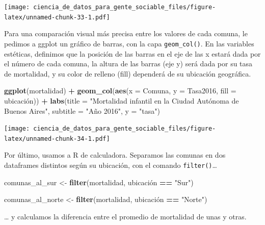 \documentclass[spanish,]{book}
\newenvironment{Shaded}{\begin{snugshade}}{\end{snugshade}}
\newcommand{\DataTypeTok}[1]{\textcolor[rgb]{0.13,0.29,0.53}{#1}}
\newcommand{\KeywordTok}[1]{\textcolor[rgb]{0.13,0.29,0.53}{\textbf{#1}}}
\newcommand{\NormalTok}[1]{#1}
\newcommand{\OperatorTok}[1]{\textcolor[rgb]{0.81,0.36,0.00}{\textbf{#1}}}
\newcommand{\StringTok}[1]{\textcolor[rgb]{0.31,0.60,0.02}{#1}}
\begin{document}
\texttt{[image: ciencia\_de\_datos\_para\_gente\_sociable\_files/figure-latex/unnamed-chunk-33-1.pdf]}

Para una comparación visual más precisa entre los valores de cada comuna, le pedimos a ggplot un gráfico de barras, con la capa \texttt{geom\_col()}. En las variables estéticas, definimos que la posición de las barras en el eje de las x estará dada por el número de cada comuna, la altura de las barras (eje y) será dada por su tasa de mortalidad, y su color de relleno (fill) dependerá de su ubicación geográfica.

\begin{Shaded}
\begin{Highlighting}[]
\KeywordTok{ggplot}\NormalTok{(mortalidad) }\OperatorTok{+}
\StringTok{    }\KeywordTok{geom_col}\NormalTok{(}\KeywordTok{aes}\NormalTok{(}\DataTypeTok{x =}\NormalTok{ Comuna, }\DataTypeTok{y =}\NormalTok{ Tasa2016, }\DataTypeTok{fill =}\NormalTok{ ubicación)) }\OperatorTok{+}
\StringTok{    }\KeywordTok{labs}\NormalTok{(}\DataTypeTok{title =} \StringTok{"Mortalidad infantil en la Ciudad Autónoma de Buenos Aires"}\NormalTok{,}
         \DataTypeTok{subtitle =} \StringTok{"Año 2016"}\NormalTok{,}
         \DataTypeTok{y =} \StringTok{"tasa"}\NormalTok{) }
\end{Highlighting}
\end{Shaded}

\texttt{[image: ciencia\_de\_datos\_para\_gente\_sociable\_files/figure-latex/unnamed-chunk-34-1.pdf]}

Por último, usamos a R de calculadora. Separamos las comunas en dos dataframes distintos según su ubicación, con el comando \texttt{filter()}\ldots{}

\begin{Shaded}
\begin{Highlighting}[]
\NormalTok{comunas_al_sur <-}\StringTok{ }\KeywordTok{filter}\NormalTok{(mortalidad, ubicación }\OperatorTok{==}\StringTok{ "Sur"}\NormalTok{)}

\NormalTok{comunas_al_norte <-}\StringTok{ }\KeywordTok{filter}\NormalTok{(mortalidad, ubicación }\OperatorTok{==}\StringTok{ "Norte"}\NormalTok{)}
\end{Highlighting}
\end{Shaded}

\ldots{} y calculamos la diferencia entre el promedio de mortalidad de unas y otras.

\begin{Shaded}
\end{Shaded}
\end{document}
